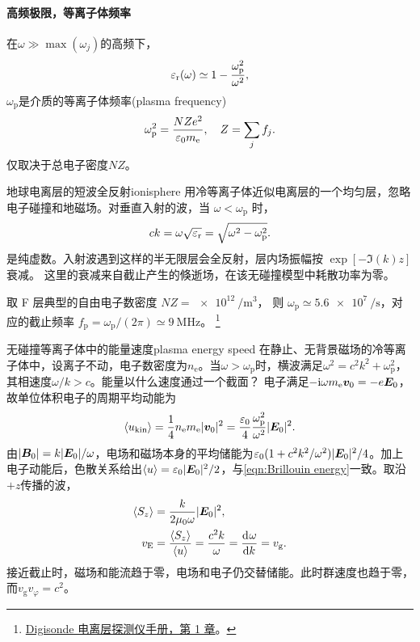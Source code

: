 \paragraph{高频极限，等离子体频率}

在$\omega \gg \max(\omega_j)$的高频下，
\begin{equation}
    \label{eq:ed-plasma-permittivity-asymptote}
    \varepsilon_\mathrm r(\omega) \simeq 1 - \frac{\omega_{\mathrm{p}}^2}{\omega^2},
\end{equation}
$\omega_{\mathrm{p}}$是介质的等离子体频率(plasma frequency)
\begin{equation}
    \omega_{\mathrm{p}}^2 = \frac{NZe^2}{\varepsilon_0m_{\mathrm{e}}},\quad Z = \sum_jf_j.
\end{equation}
仅取决于总电子密度$NZ$。
\begin{example}{地球电离层的短波全反射}{ionisphere}
    用冷等离子体近似电离层的一个均匀层，忽略电子碰撞和地磁场。对垂直入射的波，当 $\omega < \omega_{\mathrm p}$ 时，
    \[
        ck = \omega\sqrt{\varepsilon_\mathrm r} = \sqrt{\omega^2 - \omega_{\mathrm{p}}^2}.
    \]
    是纯虚数。入射波遇到这样的半无限层会全反射，层内场振幅按 $\exp[-\Im(k)z]$ 衰减。
    这里的衰减来自截止产生的倏逝场，在该无碰撞模型中耗散功率为零。

    取 F 层典型的自由电子数密度 $NZ = \qty{e12}{\per\metre\cubed}$，
    则 $\omega_{\mathrm p} \simeq \qty{5.6e7}{\per\second}$，对应的截止频率
    $f_{\mathrm p} = \omega_{\mathrm p}/(2\pi) \simeq \qty{9}{\mega\hertz}$。
    \footnote{\href{https://data.ngdc.noaa.gov/instruments/remote-sensing/active/profilers-sounders/ionosonde/documentation/Digisonde/DPS4_Operations_Manual/NewSect1.pdf}{Digisonde 电离层探测仪手册，第 1 章}。}
\end{example}
\begin{example}{无碰撞等离子体中的能量速度}{plasma energy speed}
    在静止、无背景磁场的冷等离子体中，设离子不动，电子数密度为$n_{\mathrm e}$。当$\omega > \omega_{\mathrm p}$时，横波满足$\omega^2 = c^2k^2 + \omega_{\mathrm p}^2$，其相速度$\omega/k > c$。能量以什么速度通过一个截面？
    电子满足$-\mathrm{i}\omega m_{\mathrm{e}}\bm v_0 = -e\bm E_0$，故单位体积电子的周期平均动能为
    \[
        \langle u_{\mathrm{kin}}\rangle = \frac14 n_{\mathrm e}m_{\mathrm{e}}\lvert\bm v_0\rvert^2
            = \frac{\varepsilon_0}4\frac{\omega_{\mathrm p}^2}{\omega^2}\lvert\bm E_0\rvert^2 .
    \]
    由$\lvert\bm B_0\rvert = k\lvert\bm E_0\rvert/\omega$，电场和磁场本身的平均储能为$\varepsilon_0(1 + c^2k^2/\omega^2)\lvert\bm E_0\rvert^2/4$。加上电子动能后，色散关系给出$\langle u\rangle = \varepsilon_0\lvert\bm E_0\rvert^2/2$，与\eqref{eqn:Brillouin energy}一致。取沿$+z$传播的波，
    \begin{subequations}
        \label{eq:ed-plasma-energy-velocity}
        \begin{align}
            \langle S_z\rangle &= \frac{k}{2\mu_0\omega}\lvert\bm E_0\rvert^2,\\
            v_{\mathrm E} &= \frac{\langle S_z\rangle}{\langle u\rangle} = \frac{c^2k}{\omega}
                          = \frac{\mathop{}\!\mathrm{d}^{}\omega}{\mathrm{d}{k}^{}} = v_{\mathrm g}.
        \end{align}
    \end{subequations}
    接近截止时，磁场和能流趋于零，电场和电子仍交替储能。此时群速度也趋于零，而$v_{\mathrm g}v_\varphi = c^2$。
\end{example}
